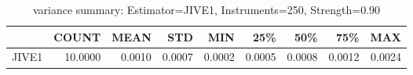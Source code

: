 \begin{table}[ht]
\centering
\caption{variance summary: Estimator=JIVE1, Instruments=250, Strength=0.90}
\begin{tabular}{lrrrrrrrr}
\toprule
 & COUNT & MEAN & STD & MIN & 25\% & 50\% & 75\% & MAX \\
\midrule
JIVE1 & 10.0000 & 0.0010 & 0.0007 & 0.0002 & 0.0005 & 0.0008 & 0.0012 & 0.0024 \\
\bottomrule
\end{tabular}
\end{table}
